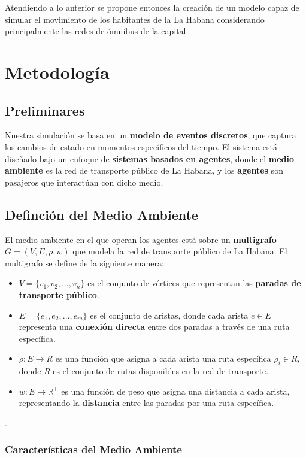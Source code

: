 \documentclass[a4paper,12pt]{article}
\begin{document}
Atendiendo a lo anterior se propone entonces la creaci\'on de un modelo capaz de simular el movimiento de los habitantes de la La Habana considerando principalmente las redes de \'omnibus de la capital. 

\section{Metodología}
\subsection{Preliminares}
Nuestra simulación se basa en un \textbf{modelo de eventos discretos}, que captura los cambios de estado en momentos específicos del tiempo. El sistema está diseñado bajo un enfoque de \textbf{sistemas basados en agentes}, donde el \textbf{medio ambiente} es la red de transporte público de La Habana, y los \textbf{agentes} son pasajeros que interactúan con dicho medio.

\subsection{Definci\'on del Medio Ambiente}

El medio ambiente en el que operan los agentes está sobre un \textbf{multigrafo} $G = (V, E, \rho, w)$ que modela la red de transporte público de La Habana. El multigrafo se define de la siguiente manera:

\begin{itemize}
    \item $V = \{v_1, v_2, \dots, v_n\}$ es el conjunto de vértices que representan las \textbf{paradas de transporte público}.
    \item $E = \{e_1, e_2, \dots, e_m\}$ es el conjunto de aristas, donde cada arista $e \in E$ representa una \textbf{conexión directa} entre dos paradas a través de una ruta específica.
    \item $\rho: E \rightarrow R$ es una función que asigna a cada arista una ruta específica $\rho_i \in R$, donde $R$ es el conjunto de rutas disponibles en la red de transporte.
    \item $w: E \rightarrow \mathbb{R}^+$ es una función de peso que asigna una distancia a cada arista, representando la \textbf{distancia} entre las paradas por una ruta específica.
\end{itemize}.

\subsubsection{Características del Medio Ambiente}
\end{document}
